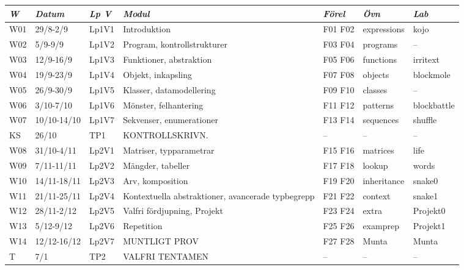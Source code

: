\begin{tabular}{l|l|l|l|l|l|l}
\textit{W} & \textit{Datum} & \textit{Lp V} & \textit{Modul} & \textit{Förel} & \textit{Övn} & \textit{Lab} \\ \hline \hline
W01 & 29/8-2/9 & Lp1V1 & Introduktion & F01 F02 & expressions & kojo \\
W02 & 5/9-9/9 & Lp1V2 & Program, kontrollstrukturer & F03 F04 & programs & -- \\
W03 & 12/9-16/9 & Lp1V3 & Funktioner, abstraktion & F05 F06 & functions & irritext \\
W04 & 19/9-23/9 & Lp1V4 & Objekt, inkapsling & F07 F08 & objects & blockmole \\
W05 & 26/9-30/9 & Lp1V5 & Klasser, datamodellering & F09 F10 & classes & -- \\
W06 & 3/10-7/10 & Lp1V6 & Mönster, felhantering & F11 F12 & patterns & blockbattle \\
W07 & 10/10-14/10 & Lp1V7 & Sekvenser, enumerationer & F13 F14 & sequences & shuffle \\
KS & 26/10 & TP1 & KONTROLLSKRIVN. & -- & -- & -- \\
W08 & 31/10-4/11 & Lp2V1 & Matriser, typparametrar & F15 F16 & matrices & life \\
W09 & 7/11-11/11 & Lp2V2 & Mängder, tabeller & F17 F18 & lookup & words \\
W10 & 14/11-18/11 & Lp2V3 & Arv, komposition & F19 F20 & inheritance & snake0 \\
W11 & 21/11-25/11 & Lp2V4 & Kontextuella abstraktioner, avancerade typbegrepp & F21 F22 & context & snake1 \\
W12 & 28/11-2/12 & Lp2V5 & Valfri fördjupning, Projekt & F23 F24 & extra & Projekt0 \\
W13 & 5/12-9/12 & Lp2V6 & Repetition & F25 F26 & examprep & Projekt1 \\
W14 & 12/12-16/12 & Lp2V7 & MUNTLIGT PROV & F27 F28 & Munta & Munta \\
T & 7/1 & TP2 & VALFRI TENTAMEN & -- & -- & -- \\
\end{tabular}
